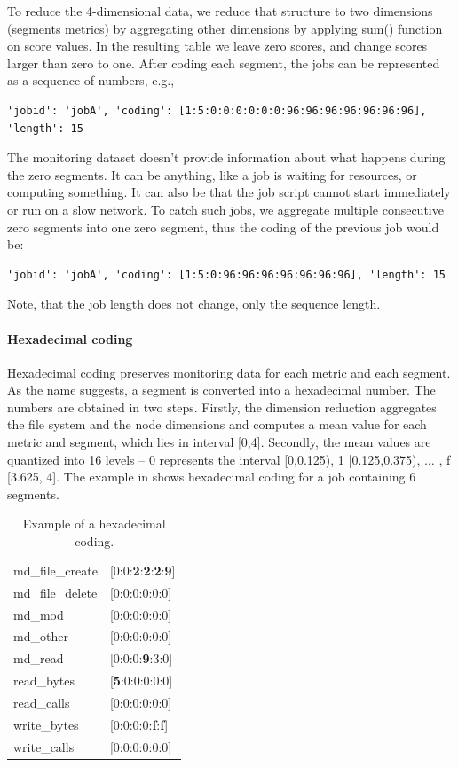 \documentclass[]{llncs}
\begin{document}
To reduce the 4-dimensional data, we reduce that structure to two dimensions (segments metrics) by aggregating other dimensions by applying sum() function on score values.
In the resulting table we leave zero scores, and change scores larger than zero to one.
After coding each segment, the jobs can be represented as a sequence of numbers, e.g.,
\begin{lstlisting}
'jobid': 'jobA', 'coding': [1:5:0:0:0:0:0:0:96:96:96:96:96:96:96], 'length': 15
\end{lstlisting}
The monitoring dataset doesn't provide information about what happens during the zero segments.
It can be anything, like a job is waiting for resources, or computing something.
It can also be that the job script cannot start immediately or run on a slow network.
To catch such jobs, we aggregate multiple consecutive zero segments into one zero segment, thus the coding of the previous job would be:

\begin{lstlisting}
'jobid': 'jobA', 'coding': [1:5:0:96:96:96:96:96:96:96], 'length': 15
\end{lstlisting}

Note, that the job length does not change, only the sequence length.
\paragraph*{Hexadecimal coding}
Hexadecimal coding preserves monitoring data for each metric and each segment.
As the name suggests, a segment is converted into a hexadecimal number.
The numbers are obtained in two steps.
Firstly, the dimension reduction aggregates the file system and the node dimensions and computes a mean value for each metric and segment, which lies in interval [0,4].
Secondly, the mean values are quantized into 16 levels -- 0 represents the interval [0,0.125), 1 [0.125,0.375), $ \ldots $ , f [3.625, 4].
The example in  shows hexadecimal coding for a job containing 6 segments.
\begin{table}
  \centering
  \begin{tabular}{ll}
    md\_file\_create & [0:0:\textbf{2}:\textbf{2}:\textbf{2}:\textbf{9}] \\ 
    md\_file\_delete & [0:0:0:0:0:0]                                     \\ 
    md\_mod          & [0:0:0:0:0:0]                                     \\ 
    md\_other        & [0:0:0:0:0:0]                                     \\ 
    md\_read         & [0:0:0:\textbf{9}:3:0]                            \\ 
    read\_bytes      & [\textbf{5}:0:0:0:0:0]                            \\ 
    read\_calls      & [0:0:0:0:0:0]                                     \\ 
    write\_bytes     & [0:0:0:0:\textbf{f}:\textbf{f}]                   \\ 
    write\_calls     & [0:0:0:0:0:0]
  \end{tabular}
  \caption{Example of a hexadecimal coding.}
  \label{tab:hex_example}
\end{table}
\end{document}
